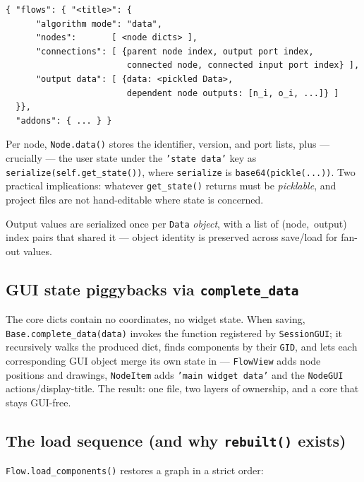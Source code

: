 \documentclass[10pt,a4paper]{article}
\newcommand{\code}[1]{\texttt{\small #1}}
\begin{document}
\begin{lstlisting}[language={}]
{ "flows": { "<title>": {
      "algorithm mode": "data",
      "nodes":       [ <node dicts> ],
      "connections": [ {parent node index, output port index,
                        connected node, connected input port index} ],
      "output data": [ {data: <pickled Data>,
                        dependent node outputs: [n_i, o_i, ...]} ]
  }},
  "addons": { ... } }
\end{lstlisting}

Per node, \code{Node.data()} stores the identifier, version, and port lists,
plus --- crucially --- the user state under the \code{'state data'} key as
\code{serialize(self.get\_state())}, where
\code{serialize} is \code{base64(pickle(...))}. Two practical implications: whatever
\code{get\_state()} returns must be \emph{picklable}, and project files are not
hand-editable where state is concerned.

Output values are serialized once per \code{Data} \emph{object}, with a list of
(node,~output) index pairs that shared it --- object identity is preserved across
save/load for fan-out values.

\subsection{GUI state piggybacks via \texttt{complete\_data}}

The core dicts contain no coordinates, no widget state. When saving,
\code{Base.complete\_data(data)} invokes the function registered by
\code{SessionGUI}; it recursively walks the produced dict, finds components by their
\code{GID}, and lets each corresponding GUI object merge its own state in ---
\code{FlowView} adds node positions and drawings, \code{NodeItem} adds
\code{'main widget data'} and the \code{NodeGUI} actions/display-title. The result: one
file, two layers of ownership, and a core that stays GUI-free.

\subsection{The load sequence (and why \texttt{rebuilt()} exists)}

\code{Flow.load\_components()} restores a graph in a strict order:
\end{document}

